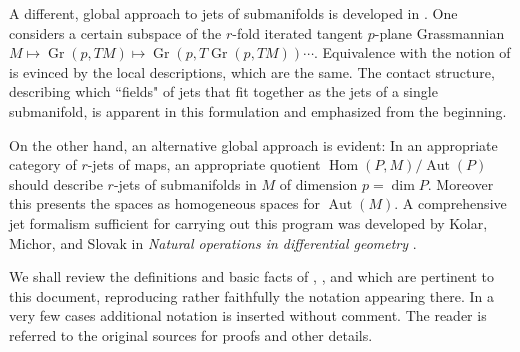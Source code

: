 \documentclass[12pt]{article}
\numberwithin{equation}{section}
\theoremstyle{plain}
\theoremstyle{definition}
\renewcommand{\P}{\mathbb{P}}
\newcommand{\Hom}{\operatorname{Hom}}
\newcommand{\Aut}{\operatorname{Aut}}
\begin{document}
A different, global approach to jets of submanifolds is developed in \cite{eds}. One considers a certain subspace of the $r$-fold iterated tangent $p$-plane Grassmannian $M\mapsto \operatorname{Gr}(p,TM)\mapsto \operatorname{Gr}(p,T\operatorname{Gr}(p,TM))\cdots $. Equivalence with the notion of \cite{olver} is evinced by the local descriptions, which are the same. The contact structure, describing which ``fields" of jets that fit together as the jets of a single submanifold, is apparent in this formulation and emphasized from the beginning.

On the other hand, an alternative global approach is evident: In an appropriate category of $r$-jets of maps, an appropriate quotient $\Hom(P,M)/\Aut(P)$ should describe $r$-jets of submanifolds in $M$ of dimension $p=\dim P$. Moreover this presents the spaces as homogeneous spaces for $\Aut(M)$. A comprehensive jet formalism sufficient for carrying out this program was developed by Kolar, Michor, and Slovak in \emph{Natural operations in differential geometry} \cite{kms}.

We shall review the definitions and basic facts of \cite{olver}, \cite{eds}, and \cite{kms} which are pertinent to this document, reproducing rather faithfully the notation appearing there. In a very few cases additional notation is inserted without comment. The reader is referred to the original sources for proofs and other details.
\end{document}
